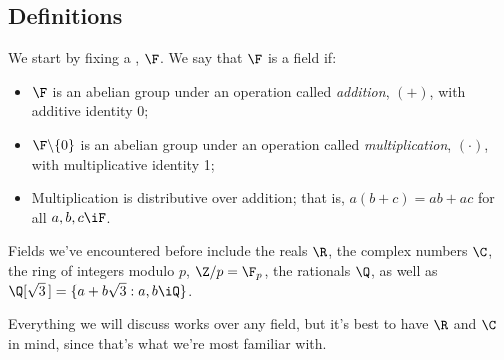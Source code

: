 \setcounter{lecture}{1}

\subsection{Definitions} %
\label{sub:definition}

We start by fixing a , $\F$. We say that $\F$ is a field if:
\begin{itemize}
	\shortskip
	\item $\F$ is an abelian group under an operation called \emph{addition}, $(+)$, with additive identity 0;
	\item $\F\backslash\{0\}$ is an abelian group under an operation called \emph{multiplication}, $(\cdot)$, with multiplicative identity 1; %
	\item Multiplication is distributive over addition; that is, $a\left( b+c \right)=ab+ac$ for all $a,b,c\iF$.
\end{itemize}
Fields we've encountered before include the reals $\R$, the complex numbers $\C$, the ring of integers modulo $p$,  $\Z/p=\F_p$, the rationals $\Q$, as well as $\Q[\sqrt{3}\,] = \{a+b\sqrt{3}: a,b\iQ\}$.

Everything we will discuss works over any field, but it's best to have $\R$ and $\C$ in mind, since that's what we're most familiar with.%

